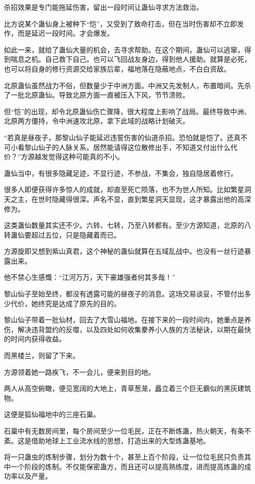 \begin{this_body}
杀招效果是专门能拖延伤害，留出一段时间让蛊仙寻求方法救治。

比方说某个蛊仙身上被种下“恺”，又受到了致命打击，但在当时伤害却不立即发作，而是延迟一段时间。才会爆发。

如此一来，就给了蛊仙大量的机会，去寻求帮助。在这个期间，蛊仙可以逃窜，得到喘息之机。自己救下自己。也可以飞回战友身边，得到他人援助。就算是必死，也可以将自身的修行资源交给家族后辈，福地落在隐蔽地点，不白白资敌。

北原蛊仙虽然战力不俗，但数量少于中洲方面。中洲又先发制人，布置暗间。先杀了一批北原蛊仙。导致北原方面一直被压入下风，节节溃败。

但“恺”的出现，却令北原蛊仙伤亡骤降，很大程度上影响了战局。最终导致中洲、北原两方僵持，令中洲速攻北原，拿下此域的战略计划破灭。

“若真是昼夜子，那黎山仙子能延迟违誓伤害的仙道杀招。恐怕就是恺了。还真不可小看黎山仙子的人脉关系。居然能请得这位散修出手，不知道又付出什么代价？”方源越发觉得这种可能真的不小。

蛊仙当中，有很多隐藏足迹，不显行迹，不参战，不集会，独自隐居着修行。

很多人即便获得许多惊人的成就，却直至死亡陨落，也不为世人所知。比如繁星洞天之主，在世时隐藏得很深。声名不显，直到繁星洞天显现，这才暴露出他的高深修为。

这类蛊仙数量其实还不少。六转、七转，乃至八转都有。至少方源知道，北原的八转蛊仙要超过五位，只是隐藏着而已。

方源旋即又想到紫山真君，这个神秘的蛊仙就算在五域乱战中。也没有一丝行迹暴露出来。

他不禁心生感慨：“江河万万，天下豪雄强者何其多哉！”

黎山仙子至始至终，都没有透露可能的昼夜子的消息。这场交易谈妥，不管付出多少代价，她终究是达成了原先的目的。

黎山仙子带着一批仙材，回去了大雪山福地。在接下来的一段时间内，她重点是养伤，解决违背盟约的反噬，以及四处如何收集豢养小人族的方法秘诀，以期在最快的时间内获得收益。

而黑楼兰，则留了下来。

方源领着她一路疾飞，不一会儿，便来到目的地。

两人从高空俯瞰，便见宽阔的大地上，青草葱茏，矗立着三个巨无霸似的黑灰建筑物。

这便是狐仙福地中的三座石巢。

石巢中有无数房间里，每个房间至少一位毛民，正在不断炼蛊，热火朝天，有条不紊。这是借助地球上工业流水线的思想，打造出来的大型炼蛊基地。

将一只蛊虫的炼制步骤，划分为数十个，甚至上百个阶段，让一位位毛民只负责其中一个阶段的炼制。不仅能保密蛊方，而且还可以提高熟练度，进而提高炼蛊的成功率以及产量。


\end{this_body}
